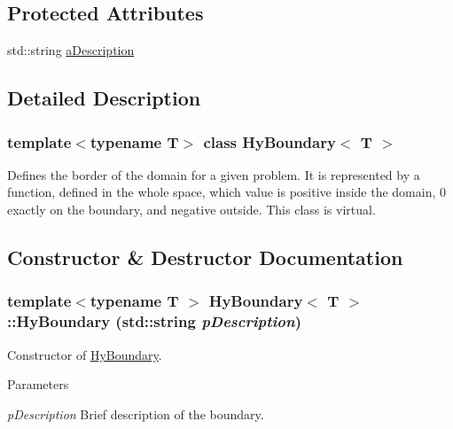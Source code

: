 \subsection*{Protected Attributes}
\begin{DoxyCompactItemize}
\item 
std::string \hyperlink{classHyBoundary_a0eeb51edf5863746b1f7dbc12c61b1c6}{aDescription}
\end{DoxyCompactItemize}


\subsection{Detailed Description}
\subsubsection*{template$<$typename T$>$ class HyBoundary$<$ T $>$}

Defines the border of the domain for a given problem. It is represented by a function, defined in the whole space, which value is positive inside the domain, 0 exactly on the boundary, and negative outside. This class is virtual. 

\subsection{Constructor \& Destructor Documentation}
\hypertarget{classHyBoundary_a7d47a3c2a01860fa91c754e049e620d5}{
\subsubsection[{HyBoundary}]{\setlength{\rightskip}{0pt plus 5cm}template$<$typename T $>$ {\bf HyBoundary}$<$ T $>$::{\bf HyBoundary} (std::string {\em pDescription})}}
\label{classHyBoundary_a7d47a3c2a01860fa91c754e049e620d5}


Constructor of \hyperlink{classHyBoundary}{HyBoundary}. 


\begin{DoxyParams}{Parameters}
\item[{\em pDescription}]Brief description of the boundary. \end{DoxyParams}


